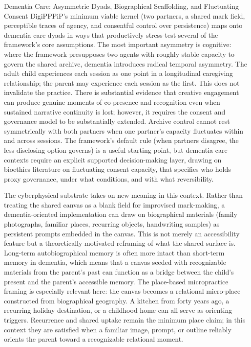 \documentclass[
  ignorenonframetext,
]{beamer}
\begin{document}
\begin{frame}[allowframebreaks]{Dementia Care: Asymmetric Dyads,
Biographical Scaffolding, and Fluctuating Consent}
\protect{}\label{dementia-care-asymmetric-dyads-biographical-scaffolding-and-fluctuating-consent}
DigiPPPiP's minimum viable kernel (two partners, a shared mark field,
perceptible traces of agency, and consentful control over persistence)
maps onto dementia care dyads in ways that productively stress-test
several of the framework's core assumptions. The most important
asymmetry is cognitive: where the framework presupposes two agents with
roughly stable capacity to govern the shared archive, dementia
introduces radical temporal asymmetry. The adult child experiences each
session as one point in a longitudinal caregiving relationship; the
parent may experience each session as the first. This does not
invalidate the practice. There is substantial evidence that creative
engagement can produce genuine moments of co-presence and recognition
even when sustained narrative continuity is lost; however, it requires
the consent and governance model to be substantially extended. Archive
control cannot rest symmetrically with both partners when one partner's
capacity fluctuates within and across sessions. The framework's default
rule (when partners disagree, the less-disclosing option governs) is a
useful starting point, but dementia care contexts require an explicit
supported decision-making layer, drawing on bioethics literature on
fluctuating consent capacity, that specifies who holds proxy governance,
under what conditions, and with what reversibility.

The cyberphysical substrate takes on new meaning in this context. Rather
than treating the shared canvas as a blank field for improvised
mark-making, a dementia-oriented implementation can draw on biographical
materials (family photographs, familiar places, recurring objects,
handwriting samples) as persistent prompts embedded in the canvas. This
is not merely an accessibility feature but a theoretically motivated
reframing of what the shared surface is. Long-term autobiographical
memory is often more intact than short-term memory in dementia, which
means that a canvas seeded with recognizable materials from the parent's
past can function as a bridge between the child's present and the
parent's accessible memory. The place-based micropractice framing is
especially relevant here: the canvas becomes a relational micro-place
constructed from biographical geography. A kitchen from forty years ago,
a recurring holiday destination, or a childhood home can all serve as
orienting triggers. Recurrence and shared uptake remain the minimum
place claim; in this context they are satisfied when a familiar image,
prompt, or outline reliably orients the parent toward a recognizable
relational moment.


\end{frame}
\end{document}
